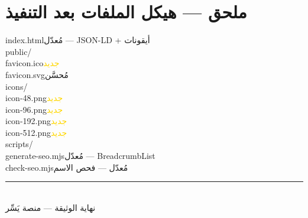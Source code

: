 \documentclass[11pt]{article}
\begin{document}
\section{ملحق — هيكل الملفات بعد التنفيذ}
\begin{tcolorbox}[colback=darkbg, colframe=darkbg, coltext=white, arc=3pt, left=8pt, right=8pt]
\ttfamily\small\raggedleft
index.html\hspace{1em}\textcolor{okgreen}{مُعدّل — JSON-LD + أيقونات}\\
public/\\
\hspace*{1em}favicon.ico\hspace{1em}\textcolor{gold}{جديد}\\
\hspace*{1em}favicon.svg\hspace{1em}\textcolor{okgreen}{مُحسَّن}\\
\hspace*{1em}icons/\\
\hspace*{2em}icon-48.png\hspace{1em}\textcolor{gold}{جديد}\\
\hspace*{2em}icon-96.png\hspace{1em}\textcolor{gold}{جديد}\\
\hspace*{2em}icon-192.png\hspace{1em}\textcolor{gold}{جديد}\\
\hspace*{2em}icon-512.png\hspace{1em}\textcolor{gold}{جديد}\\
scripts/\\
\hspace*{1em}generate-seo.mjs\hspace{1em}\textcolor{okgreen}{مُعدّل — BreadcrumbList}\\
\hspace*{1em}check-seo.mjs\hspace{1em}\textcolor{okgreen}{مُعدّل — فحص الاسم}
\end{tcolorbox}

\vfill
\begin{center}
\rule{0.5\textwidth}{0.4pt}\\[0.4cm]
{\small\color{midgray} نهاية الوثيقة — منصة يَسِّر}
\end{center}
\end{document}
